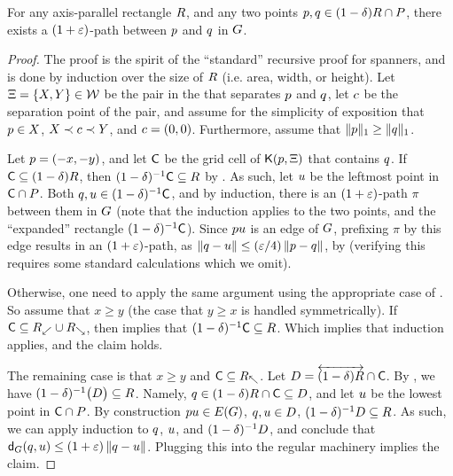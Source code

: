 \documentclass[12pt]{article}%
\begin{document}
\begin{lemma}
    For any axis-parallel rectangle $R$, and any two points
    $p, q \in (1-\delta)R \cap P$, there exists a
    $(1+\varepsilon)$-path between $p$ and $q$ in $G$.
\end{lemma}
\begin{proof}
    The proof is the spirit of the ``standard'' recursive proof for
    spanners, and is done by induction over the size of $R$ (i.e. area, width, or height). Let $\Xi = \{ X, Y \} \in \mathcal{W}$ be the pair in
    the \QSPD that separates $p$ and $q$, let $c$ be the
    separation point of the pair, and assume for the simplicity of
    exposition that $p \in X$, $X \prec c \prec Y$, and
    $c = (0,0)$. Furthermore, assume that
    $\|p\|_1 \geq \|q\|_1$.

    Let  $p = (-x,-y)$, and let $\mathsf{C}$ be the grid cell of $\mathsf{K}(p, \Xi)$ that contains
    $q$. If
    $\mathsf{C} \subseteq (1-\delta)R$, then
    $(1-\delta)^{-1}\mathsf{C} \subseteq R$ by 
    . As such, let $u$ be the leftmost point in
    $\mathsf{C} \cap P$. Both
    $q, u \in (1-\delta)^{-1}\mathsf{C}$, and by induction, there is an
    $(1+\varepsilon)$-path $\pi$ between them in $G$ (note that the
    induction applies to the two points, and the ``expanded''
    rectangle $(1-\delta)^{-1}\mathsf{C}$). Since $p u$ is an edge of
    $G$, prefixing $\pi$ by this edge results in an $(1+\varepsilon)$-path,
    as $\left\| q - u \right\| \leq (\varepsilon/4) \left\| p - q \right\|$, by 
     (verifying this requires some standard
    calculations which we omit).

    Otherwise, one need to apply the same argument using the
    appropriate case of .  So assume that $x \geq y$
    (the case that $y \geq x$ is handled symmetrically). If
    $\mathsf{C} \subseteq R_\swarrow \cup R_\searrow$, then
     implies that
    $(1-\delta)^{-1} \mathsf{C} \subseteq R$. Which implies that
    induction applies, and the claim holds.

    The remaining case is that $x \geq y$ and
    $\mathsf{C} \subseteq R_\nwarrow$.  Let
    $D= \overleftrightarrow{ (1-\delta)R} \cap \mathsf{C}$.  By ,
    we have $(1-\delta)^{-1} \bigl(D \bigr) \subseteq
    R$. Namely,
    $q \in (1-\delta)R \cap \mathsf{C} \subseteq D$, and let
    $u$ be the lowest point in $\mathsf{C} \cap P$. By construction
    $\pa \pc \in \EGX{\G}$, $q, u \in D$,
    $(1-\delta)^{-1} D \subseteq R$. As such, we can apply
    induction to $q$, $u$, and $(1-\delta)^{-1} D$, and
    conclude that $\dGZ{\G}{\pb}{\pc} \leq (1+\eps) \dY{\pb}{\pc}$.
    Plugging this into the regular machinery implies the claim.
\end{proof}
\end{document}
